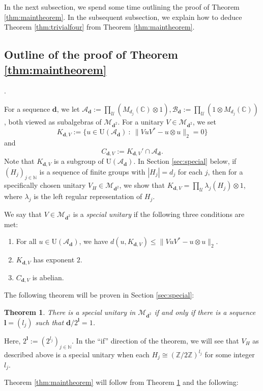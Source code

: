 \documentclass[12pt]{amsart}
\numberwithin{equation}{section}
\newtheorem{thm}{Theorem}[section]
\theoremstyle{definition}
\newcommand{\C}{\mathbb{C}}
\newcommand{\N}{\mathbb{N}}
\newcommand{\Z}{\mathbb{Z}}
\def\cal{\mathcal}
\def\M{\mathcal{M}}
\newcommand\cU{{\cal U}}
\def \M{\mathcal{M}}
\def \A{\mathcal{A}}
\def \B{\mathcal{B}}
\def \boldd{\mathbf{d}}
\begin{document}
In the next subsection, we spend some time outlining the proof of Theorem \ref{thm:maintheorem}.  In the subsequent subsection, we explain how to deduce Theorem \ref{thm:trivialfour} from Theorem \ref{thm:maintheorem}.

\subsection{Outline of the proof of Theorem \ref{thm:maintheorem}}.

For a sequence $\boldd$, we let $\A_{\boldd}:=\prod_\cU (M_{d_j}(\C)\otimes 1),\B_{\boldd}:=\prod_\cU (1\otimes M_{d_j}(\C))$, both viewed as subalgebras of $\M_{\boldd^2}$.   For a unitary $V\in \M_{\boldd^2}$, we set $$K_{\boldd,V}:=\{u\in \mathrm{U}(\A_{\boldd}) \ : \ \|VuV^*-u\otimes u\|_2=0\}$$ and $$C_{\boldd,V}:=K_{\boldd,V}'\cap \A_\boldd.$$  Note that $K_{\boldd,V}$ is a subgroup of $\mathrm{U}(\A_\boldd)$.  In Section \ref{sec:special} below, if $(H_j)_{j\in \N}$ is a sequence of finite groups with $|H_j|=d_j$ for each $j$, then for a specifically chosen unitary $V_H\in \M_{\mathbf{d}^2}$, we show that $K_{\mathbf{d},V}=\prod_\cU \lambda_j(H_j)\otimes 1$, where $\lambda_j$ is the left regular representation of $H_j$. 


We say that $V\in \M_{\mathbf{d}^2}$ is a \emph{special unitary} if the following three conditions are met:
\begin{enumerate}
    \item For all $u\in \mathrm{U}(\A_\boldd)$, we have $d(u,K_{\boldd,V})\leq \|VuV^*-u\otimes u\|_2$.
    \item $K_{\boldd,V}$ has exponent $2$.
    \item $C_{\boldd,V}$ is abelian.
\end{enumerate}

The following theorem will be proven in Section \ref{sec:special}:

\begin{thm}\label{thm:special}
There is a special unitary in $\M_{\boldd^2}$ if and only if there is a sequence $\mathbf{l}=(l_j)$ such that $\mathbf{d}/2^{\mathbf{l}}=1$.
\end{thm}

Here, $2^{\mathbf{l}}:=(2^{l_j})_{j\in \N}$.  In the ``if'' direction of the theorem, we will see that $V_H$ as described above is a special unitary when each $H_j\cong (\Z/2\Z)^{l_j}$ for some integer $l_j$.

Theorem \ref{thm:maintheorem} will follow from Theorem \ref{thm:special} and the following:  
\end{document}
